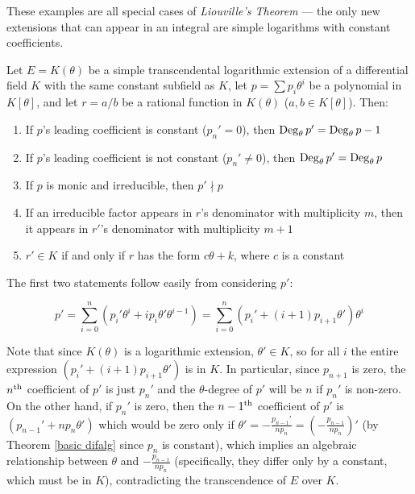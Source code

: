 
These examples are all special cases of {\it Liouville's Theorem} ---
the only new extensions that can appear in an integral are simple
logarithms with constant coefficients.

\theorem\label{basic logarithmic properties}
Let $E=K(\theta)$ be a simple transcendental logarithmic extension of
a differential field $K$ with the same constant subfield as $K$, let
$p=\sum p_i \theta^i$ be a polynomial in $K[\theta]$, and let $r =
a/b$ be a rational function in $K(\theta)$ ($a, b \in K[\theta]$).
Then:

\begin{enumerate}
\item If $p$'s leading coefficient is constant ($p_n' = 0$), then ${\rm Deg}_\theta\, p' = {\rm Deg}_\theta\, p - 1$
\item If $p$'s leading coefficient is not constant ($p_n' \ne 0$), then ${\rm Deg}_\theta\, p' = {\rm Deg}_\theta\, p$
\item If $p$ is monic and irreducible, then $p' \nmid p$
\item If an irreducible factor appears in $r$'s denominator with multiplicity
$m$, then it appears in $r'$'s denominator with multiplicity $m+1$
\item $r' \in K$ if and only if $r$ has the form $c\theta + k$, where $c$ is a constant
\end{enumerate}

\proof

The first two statements follow easily from considering $p'$:

$$p'=\sum_{i=0}^n (p_i' \theta^i + i p_i \theta' \theta^{i-1}) = \sum_{i=0}^n
\left(p_i' + \left(i+1\right)p_{i+1} \theta'\right) \theta^i$$

Note that since $K(\theta)$ is a logarithmic extension, $\theta'
\in K$, so for all $i$ the entire expression $(p_i' + (i+1)p_{i+1} \theta')$
is in $K$.  In particular, since $p_{n+1}$ is zero, the $n^{\rm th}$
coefficient of $p'$ is just $p_n'$ and the $\theta$-degree of $p'$
will be $n$ if $p_n'$ is non-zero.  On the other hand, if $p_n'$ is
zero, then the $n-1^{\rm th}$ coefficient of $p'$ is $(p_{n-1}' + n
p_n \theta')$ which would be zero only if $\theta' =
-\frac{p_{n-1}'}{n p_n} = (-\frac{p_{n-1}}{n p_n})'$ (by Theorem
\ref{basic difalg} since $p_n$ is constant), which implies
an algebraic relationship between $\theta$ and $-\frac{p_{n-1}}{n
p_n}$ (specifically, they differ only by a constant, which must be in
$K$), contradicting the transcendence of $E$ over $K$.

